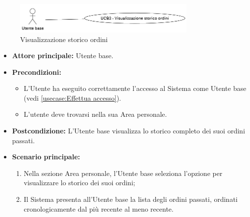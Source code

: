 \label{usecase:Storico ordini}

\begin{figure}[h]
	\centering
	\includegraphics[width=0.8\textwidth]{./uml/UCB3.png} 
	\caption{Visualizzazione storico ordini}
	\label{fig:UCB3}
  \end{figure}

\begin{itemize}
	\item \textbf{Attore principale:} Utente base.

	\item \textbf{Precondizioni:}
	      \begin{itemize}
		      \item L'Utente ha eseguito correttamente l'accesso al Sistema come Utente base (vedi \autoref{usecase:Effettua accesso}).
		      \item L'utente deve trovarsi nella sua Area personale.
	      \end{itemize}

	\item \textbf{Postcondizione:} L'Utente base visualizza lo storico completo dei suoi ordini passati.

	\item \textbf{Scenario principale:}
	      \begin{enumerate}
		      \item Nella sezione Area personale, l'Utente base seleziona l'opzione per visualizzare lo storico dei suoi ordini;
		      \item Il Sistema presenta all'Utente base la lista degli ordini passati, ordinati cronologicamente dal più recente al meno recente.
	      \end{enumerate}
\end{itemize}

